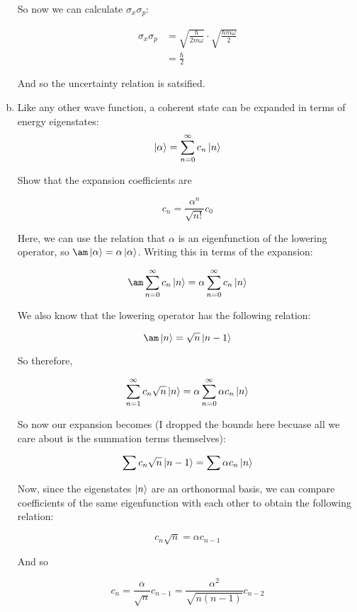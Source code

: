 \documentclass[10pt]{article}
\begin{document}
\begin{enumerate}[(a)]
\begin{solution}
            So now we can calculate $\sigma_x\sigma_p$: 

            \begin{align*}
                \sigma_x \sigma_p &= \sqrt{\frac{\hbar}{2m \omega}} \cdot \sqrt{\frac{\hbar m \omega}{2}}\\
                &= \frac{\hbar}{2}
            \end{align*}

            And so the uncertainty relation is satsified.
        \end{solution}
        \item Like any other wave function, a coherent state can be expanded in terms of energy eigenstates:
        \[ \ket \alpha = \sum_{n = 0}^\infty c_n \ket n\] 

        Show that the expansion coefficients are

        \[ c_n = \frac{\alpha^n}{\sqrt{n!}} c_0\]

        \begin{solution}
            Here, we can use the relation that $\alpha$ is an eigenfunction of the lowering operator, so $\am \ket \alpha = \alpha \ket \alpha$. Writing this in terms of the expansion: 

            \[ \am \sum_{n = 0}^\infty c_n \ket n = \alpha \sum_{n = 0}^\infty c_n \ket n\]

            We also know that the lowering operator has the following relation: 

            \[ \am \ket n = \sqrt{n} \ket{n-1}\]

            So therefore, 

            \[ \sum_{n = 1}^\infty c_n \sqrt{n} \ket n = \alpha \sum_{n = 0}^\infty \alpha c_n \ket n\]

            So now our expansion becomes (I dropped the bounds here becuase all we care about is the summation terms themselves): 

            \[ \sum c_n \sqrt{n} \ket{n -1} = \sum \alpha c_n \ket n\]

            Now, since the eigenstates $\ket n$ are an orthonormal basis, we can compare coefficients of the same eigenfunction with each other to obtain the following relation: 

            \[ c_n \sqrt{n} = \alpha c_{n-1} \]

            And so 

            \[ c_n = \frac{\alpha}{\sqrt{n}} c_{n-1} = \frac{\alpha^2}{\sqrt{n(n-1)}} c_{n - 2}\]


\end{solution}
\end{enumerate}
\end{document}
